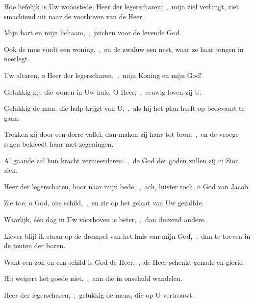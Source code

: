 \documentclass[12pt,twoside,a5paper]{article}
\begin{document}


\begin{halfparskip}
  Hoe liefelijk is Uw woonstede, Heer der legerscharen;~\sep\ mijn ziel verlangt, ziet smachtend uit naar de voorhoven van de Heer.


  Mijn hart en mijn lichaam,~\sep\ juichen voor de levende God.

  Ook de mus vindt een woning,~\sep\ en de zwaluw een nest, waar ze haar jongen in neerlegt.

  Uw altaren, o Heer der legerscharen,~\sep\ mijn Koning en mijn God!
\end{halfparskip}


\begin{halfparskip}
  Gelukkig zij, die wonen in Uw huis, O Heer;~\sep\ eeuwig loven zij U.

  Gelukkig de man, die hulp krijgt van U,~\sep\ als hij het plan heeft op bedevaart te gaan:

  Trekken zij door een dorre vallei, dan maken zij haar tot bron,~\sep\ en de vroege regen bekleedt haar met zegeningen.

  Al gaande zal hun kracht vermeerderen:~\sep\ de God der goden zullen zij in Sion zien.
\end{halfparskip}


\begin{halfparskip}
  Heer der legerscharen, hoor naar mijn bede,~\sep\ ach, luister toch, o God van Jacob.

  Zie toe, o God, ons schild,~\sep\ en zie op het gelaat van Uw gezalfde.

  Waarlijk, één dag in Uw voorhoven is beter,~\sep\ dan duizend andere.

  Liever blijf ik staan op de drempel van het huis van mijn God,~\sep\ dan te toeven in de tenten der bozen.

  Want een zon en een schild is God de Heer;~\sep\ de Heer schenkt genade en glorie.

  Hij weigert het goede niet,~\sep\ aan die in onschuld wandelen.

  Heer der legerscharen,~\sep\ gelukkig de mens, die op U vertrouwt.
\end{halfparskip}
\end{document}
